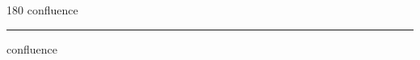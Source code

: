 
\begin{frame}
\begin{center}
\begin{turn}{180}
{\fontsize{2.5cm}{1em}\selectfont confluence}
\end{turn}
\vspace{1em}\par  
\hrule
\vspace{1em}\par  
{\fontsize{2.5cm}{1em}\selectfont confluence}
\end{center}
\end{frame}
